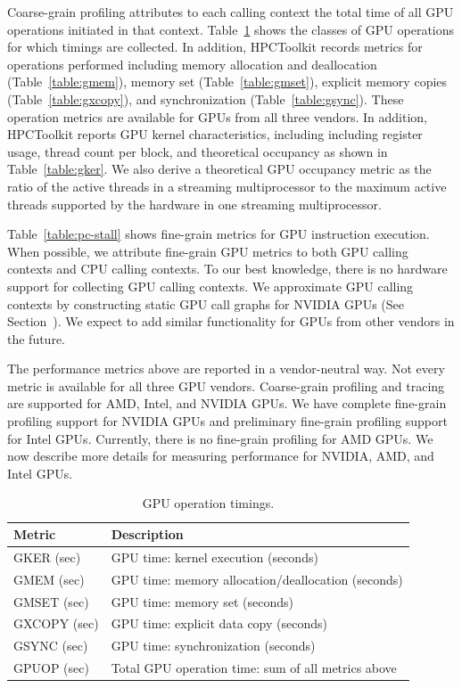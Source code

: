 Coarse-grain profiling attributes to each calling context the total time of all GPU operations initiated in that context. Table~\ref{table:gtimes} shows the classes of GPU operations for which timings are collected. In addition, HPCToolkit records metrics for operations performed including memory allocation and deallocation (Table~\ref{table:gmem}), memory set (Table~\ref{table:gmset}), explicit memory copies (Table~\ref{table:gxcopy}), and synchronization (Table~\ref{table:gsync}). These operation metrics are available for GPUs from all three vendors. In addition, HPCToolkit reports GPU kernel characteristics, including including register usage, thread count per block, and theoretical occupancy as shown in Table~\ref{table:gker}. We also derive a theoretical GPU occupancy metric as the ratio of the active threads in a streaming multiprocessor to the maximum active threads supported by the hardware in one streaming multiprocessor.

Table~\ref{table:pc-stall} shows fine-grain metrics for GPU instruction execution.
When possible, we attribute fine-grain GPU metrics to both GPU calling contexts and CPU calling contexts.
To our best knowledge, there is no hardware support for collecting GPU calling contexts.
We approximate GPU calling contexts by constructing static GPU call graphs for NVIDIA GPUs (See Section~\label{nvidia-cct}).
We expect to add similar functionality for GPUs from other vendors in the future.

The performance metrics above are reported in a vendor-neutral way. Not every metric is available for all three GPU vendors.
Coarse-grain profiling and tracing are supported for AMD, Intel, and NVIDIA GPUs. We have complete fine-grain profiling support for NVIDIA GPUs and preliminary fine-grain profiling support for Intel GPUs. Currently, there is no fine-grain profiling for AMD GPUs. We now describe more details for measuring performance for NVIDIA, AMD, and Intel GPUs.


\begin{table}[t]
\centering
\begin{tabular}{|l|l|}\hline
Metric & Description\\\hline\hline
 GKER (sec)  &  GPU time: kernel execution (seconds)  \\\hline 
  GMEM (sec)  &  GPU time: memory allocation/deallocation (seconds)  \\\hline 
  GMSET (sec)  &  GPU time: memory set (seconds)  \\\hline 
  GXCOPY (sec)  &  GPU time: explicit data copy (seconds)  \\\hline 
  GSYNC (sec)  &  GPU time: synchronization (seconds)  \\\hline 
 GPUOP (sec) & Total GPU operation time: sum of all metrics above \\\hline
\end{tabular}
\caption{GPU operation timings.}
\label{table:gtimes}
\end{table}

